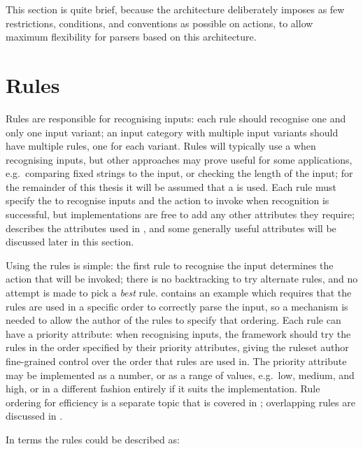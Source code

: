 This section is quite brief, because the architecture deliberately imposes
as few restrictions, conditions, and conventions as possible on actions, to
allow maximum flexibility for parsers based on this architecture.

\section{Rules}

\label{rules in architecture}

Rules are responsible for recognising inputs: each rule should recognise
one and only one input variant; an input category with multiple input
variants should have multiple rules, one for each variant.  Rules will
typically use a  when recognising inputs, but other
approaches may prove useful for some applications, e.g.\ comparing fixed
strings to the input, or checking the length of the input; for the
remainder of this thesis it will be assumed that a  is used.
Each rule must specify the  to recognise inputs and the
action to invoke when recognition is successful, but implementations are
free to add any other attributes they require; 
describes the attributes used in \parsername{}, and some generally useful
attributes will be discussed later in this section.

Using the rules is simple: the first rule to recognise the input determines
the action that will be invoked; there is no backtracking to try alternate
rules, and no attempt is made to pick a \textit{best\/} rule.
 contains an example which
requires that the rules are used in a specific order to correctly parse the
input, so a mechanism is needed to allow the author of the rules to specify
that ordering.  Each rule can have a priority attribute: when recognising
inputs, the framework should try the rules in the order specified by their
priority attributes, giving the ruleset author fine-grained control over
the order that rules are used in.  The priority attribute may be
implemented as a number, or as a range of values, e.g.\ low, medium, and
high, or in a different fashion entirely if it suits the implementation.
Rule ordering for efficiency is a separate topic that is covered in
; overlapping rules are discussed
in .

In  terms the rules could be described as:

